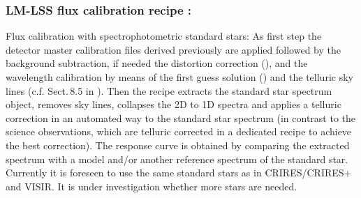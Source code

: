 \clearpage
\subsubsection{LM-LSS flux calibration recipe :}\label{rec:lsslmflux}
Flux calibration with spectrophotometric standard stars: As first step the detector master calibration files derived previously are applied followed by the background subtraction, if needed the distortion correction (), and
the wavelength calibration by means of the first guess solution () and the telluric sky lines (c.f. Sect.\,8.5 in \cite{DRLS}). Then the recipe extracts the standard star spectrum object, removes sky lines, collapses the 2D to 1D spectra and applies a telluric correction in an automated way to the standard star spectrum (in contrast to the science observations, which are telluric corrected in a dedicated recipe to achieve the best correction). The response curve is obtained by comparing the extracted spectrum with a model and/or another reference spectrum of the standard star. Currently it is foreseen to use the same standard stars as in \ac{CRIRES}/CRIRES+ and \ac{VISIR}. It is under investigation whether more stars are needed.
